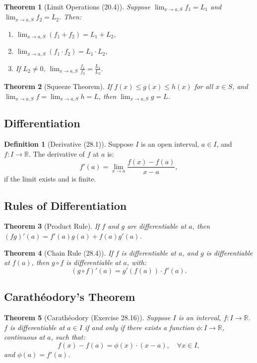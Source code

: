 \documentclass[9pt]{article}
\theoremstyle{definition}
\newtheorem{definition}{Definition}
\theoremstyle{plain}
\newtheorem{theorem}{Theorem}
\begin{document}
\begin{theorem}[Limit Operations (20.4)]
Suppose \( \lim_{x \to a, S} f_1 = L_1 \) and \( \lim_{x \to a, S} f_2 = L_2 \). Then:
\begin{enumerate}
    \item \( \lim_{x \to a, S} (f_1 + f_2) = L_1 + L_2 \),
    \item \( \lim_{x \to a, S} (f_1 \cdot f_2) = L_1 \cdot L_2 \),
    \item If \( L_2 \neq 0 \), \( \lim_{x \to a, S} \frac{f_1}{f_2} = \frac{L_1}{L_2} \).
\end{enumerate}
\end{theorem}

\begin{theorem}[Squeeze Theorem]
If \( f(x) \leq g(x) \leq h(x) \) for all \( x \in S \), and \( \lim_{x \to a, S} f = \lim_{x \to a, S} h = L \), then \( \lim_{x \to a, S} g = L \).
\end{theorem}

\subsection*{Differentiation}
\begin{definition}[Derivative (28.1)]
Suppose \( I \) is an open interval, \( a \in I \), and \( f : I \to \mathbb{R} \). The derivative of \( f \) at \( a \) is:
\[
f'(a) = \lim_{x \to a} \frac{f(x) - f(a)}{x - a},
\]
if the limit exists and is finite.
\end{definition}

\subsection*{Rules of Differentiation}
\begin{theorem}[Product Rule]
If \( f \) and \( g \) are differentiable at \( a \), then \( (fg)'(a) = f'(a)g(a) + f(a)g'(a) \).
\end{theorem}

\begin{theorem}[Chain Rule (28.4)]
If \( f \) is differentiable at \( a \), and \( g \) is differentiable at \( f(a) \), then \( g \circ f \) is differentiable at \( a \), with:
\[
(g \circ f)'(a) = g'(f(a)) \cdot f'(a).
\]
\end{theorem}

\subsection*{Carathéodory’s Theorem}
\begin{theorem}[Carathéodory (Exercise 28.16)]
Suppose \( I \) is an interval, \( f : I \to \mathbb{R} \). \( f \) is differentiable at \( a \in I \) if and only if there exists a function \( \phi : I \to \mathbb{R} \), continuous at \( a \), such that:
\[
f(x) - f(a) = \phi(x) \cdot (x - a), \quad \forall x \in I,
\]
and \( \phi(a) = f'(a) \).
\end{theorem}
\end{document}
